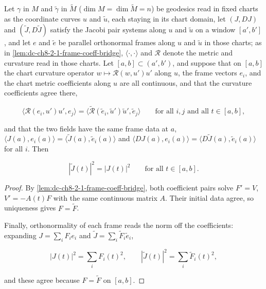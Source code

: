 \begin{lemma}
  \label{lem:dc-ch8-2-1-jacobi-norm-transfer-general}


  Let $\gamma$ in $M$ and $\tilde\gamma$ in $\tilde M$ ($\dim M=\dim\tilde M=n$) be geodesics
  read in fixed charts as the coordinate curves $u$ and $\tilde u$, each staying in its chart
  domain, let $(J,DJ)$ and $(\tilde J,D\tilde J)$ satisfy the Jacobi pair systems along $u$
  and $\tilde u$ on a window $[a',b']$, and let $e$ and $\tilde e$ be parallel orthonormal
  frames along $u$ and $\tilde u$ in those charts; as in
  \cref{lem:dc-ch8-2-1-frame-coeff-bridge}, $\langle\cdot,\cdot\rangle$ and $\mathcal R$
  denote the metric and curvature read in those charts. Let $[a,b]\subset(a',b')$, and
  suppose that on $[a,b]$ the chart curvature operator $w\mapsto\mathcal R(w,u')u'$ along
  $u$, the frame vectors $e_i$, and the chart metric coefficients along $u$ are all
  continuous, and that the curvature coefficients agree there,

  $$
  \langle\mathcal R(e_i,u')u',e_j\rangle
  =\big\langle\tilde{\mathcal R}(\tilde e_i,\tilde u')\tilde u',\tilde e_j\big\rangle
  \qquad\text{for all }i,j\text{ and all }t\in[a,b],
  $$

  and that the two fields have the same frame data at $a$,
  $\langle J(a),e_i(a)\rangle=\langle\tilde J(a),\tilde e_i(a)\rangle$ and
  $\langle DJ(a),e_i(a)\rangle=\langle D\tilde J(a),\tilde e_i(a)\rangle$ for all $i$.
  Then

  $$
  |\tilde J(t)|^2=|J(t)|^2\qquad\text{for all }t\in[a,b] .
  $$

\end{lemma}
\begin{proof}

\sketch
  By \cref{lem:dc-ch8-2-1-frame-coeff-bridge}, both coefficient pairs solve
  $F'=V$, $V'=-A(t)F$ with the same continuous matrix $A$. Their initial data agree,
  so uniqueness gives $F=\tilde F$.

  Finally, orthonormality of each frame reads the norm off the coefficients: expanding
  $J=\sum_i F_ie_i$ and $\tilde J=\sum_i\tilde F_i\tilde e_i$,

  $$
  |J(t)|^2=\sum_i F_i(t)^2,\qquad |\tilde J(t)|^2=\sum_i\tilde F_i(t)^2 ,
  $$

  and these agree because $F=\tilde F$ on $[a,b]$.
\end{proof}

